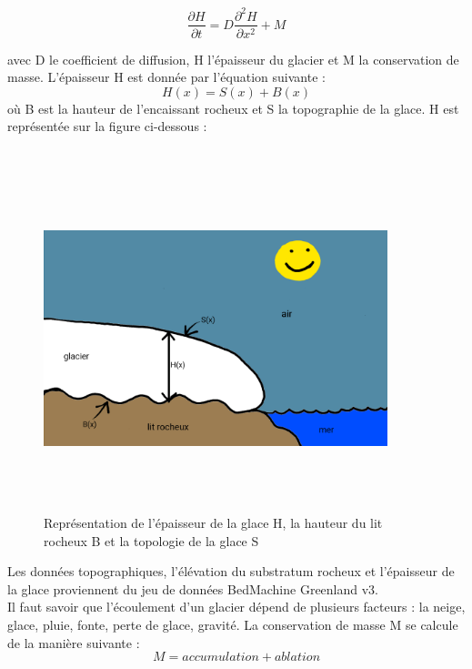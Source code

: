 \documentclass{article}
\begin{document}
\begin{equation}
\frac{\partial H}{\partial t}=D\frac{{\partial}^{2}H}{\partial x^{2}} + M
\label{eq4}
\end{equation}

avec D le coefficient de diffusion, H l'épaisseur du glacier et M la conservation de masse.
\newpage
L'épaisseur H est donnée par l'équation suivante :
\begin{equation}
H(x) = S(x) + B(x)
\label{eq4}
\end{equation}
où B est la hauteur de l'encaissant rocheux et S la topographie de la glace. H est représentée sur la figure ci-dessous : 
\\
\\
\begin{figure}[!htpb]
\centering
\includegraphics[width=10cm, keepaspectratio=true, height=10cm]{H.png}
\caption{Représentation de l'épaisseur de la glace H, la hauteur du lit rocheux B et la topologie de la glace S}
\label{fig01ch1}
\end{figure}
\newline
Les données topographiques, l'élévation du substratum rocheux et l'épaisseur de la glace proviennent du jeu de données BedMachine Greenland v3. 
\\

Il faut savoir que l'écoulement d'un glacier dépend de plusieurs facteurs : la neige, glace, pluie, fonte, perte de glace, gravité. La conservation de masse M se calcule de la manière suivante :
\begin{equation}
M = accumulation + ablation
\label{5}
\end{equation}
\end{document}
